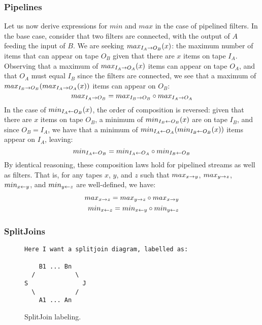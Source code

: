 \subsubsection{Pipelines}

Let us now derive expressions for $min$ and $max$ in the case of
pipelined filters.  In the base case, consider that two filters are
connected, with the output of $A$ feeding the input of $B$.  We are
seeking $max_{I_A \rightarrow O_B}(x)$: the maximum number of items that can
appear on tape $O_B$ given that there are $x$ items on tape $I_A$.
Observing that a maximum of $max_{I_A \rightarrow O_A}(x)$ items can appear on
tape $O_A$, and that $O_A$ must equal $I_B$ since the filters are
connected, we see that a maximum of
$max_{I_B \rightarrow O_B}(max_{I_A \rightarrow O_A}(x))$ items can appear on $O_B$:
\begin{equation*}
max_{I_A \rightarrow O_B} = max_{I_B \rightarrow O_B} \circ max_{I_A \rightarrow O_A}
\end{equation*}
In the case of $min_{I_A \leftarrow O_B}(x)$, the order of composition is
reversed: given that there are $x$ items on tape $O_B$, a minimum of
$min_{I_B \leftarrow O_B}(x)$ are on tape $I_B$, and since $O_B = I_A$, we have
that a minimum of $min_{I_A \leftarrow O_A}(min_{I_B \leftarrow O_B}(x))$ items appear on
$I_A$, leaving:
\begin{equation*}
min_{I_A \leftarrow O_B} = min_{I_A \leftarrow O_A} \circ min_{I_B \leftarrow O_B}
\end{equation*}
By identical reasoning, these composition laws hold for pipelined
streams as well as filters.  That is, for any tapes $x$, $y$, and $z$
such that $max_{x \rightarrow y}$, $max_{y \rightarrow z}$, $min_{x \leftarrow y}$, and $min_{y \leftarrow z}$ are
well-defined, we have:
\begin{eqnarray}
\label{eq:compose}
max_{x \rightarrow z} = max_{y \rightarrow z} \circ max_{x \rightarrow y} \\
min_{x \leftarrow z} = min_{x \leftarrow y} \circ min_{y \leftarrow z}
\end{eqnarray}

\subsubsection{SplitJoins}
\begin{figure}[t]
\scriptsize
\begin{verbatim}
Here I want a splitjoin diagram, labelled as:

    B1 ... Bn 
  /           \
S               J
  \           /
    A1 ... An

\end{verbatim}
\vspace{-12pt}
\caption{\protect\small SplitJoin labeling.
\protect\label{splitjoin}}
\vspace{-12pt}
\end{figure}

